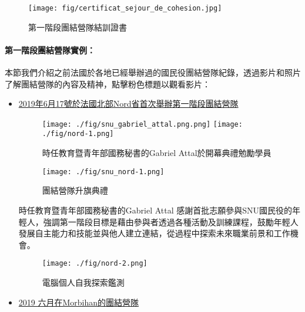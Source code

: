 \documentclass[a4paper,14pt]{extarticle}
\theoremstyle{plain}
\theoremstyle{remark}
\numberwithin{equation}{section}
\begin{document}
\begin{figure}[H]
  \begin{center}
    \texttt{[image: fig/certificat\_sejour\_de\_cohesion.jpg]}
  \end{center}
  \caption{第一階段團結營隊結訓證書}
  \label{fig:certificat_1e_phase}
\end{figure}

\paragraph{第一階段團結營隊實例：}


本節我們介紹之前法國於各地已經舉辦過的國民役團結營隊紀錄，透過影片和照片了解團結營隊的內容及精神，點擊粉色標題以觀看影片：

\begin{itemize}

	\item \href{https://www.youtube.com/watch?v=fKXpSj1DoSQ}{2019年6月17號於法國北部Nord省首次舉辦第一階段團結營隊}
	
	\begin{figure}[H]
    \centering
		\texttt{[image: ./fig/snu\_gabriel\_attal.png.png]}
		\texttt{[image: ./fig/nord-1.png]}
		\caption{時任教育暨青年部國務秘書的Gabriel Attal於開幕典禮勉勵學員}
	\end{figure}

	\begin{figure}[H]
    \centering
		\texttt{[image: ./fig/snu\_nord-1.png]}
    \caption{團結營隊升旗典禮}
	\end{figure}
	時任教育暨青年部國務秘書的Gabriel Attal 感謝首批志願參與SNU國民役的年輕人，強調第一階段目標是藉由參與者透過各種活動及訓練課程，鼓勵年輕人發展自主能力和技能並與他人建立連結，從過程中探索未來職業前景和工作機會。

	\begin{figure}[H]
    \centering
		\texttt{[image: ./fig/nord-2.png]}
    \caption{電腦個人自我探索鑑測}
	\end{figure}


	\item \href{https://www.youtube.com/watch?v=4k2csnrQBPA}{2019 六月在Morbihan的團結營隊}



\end{itemize}
\end{document}
